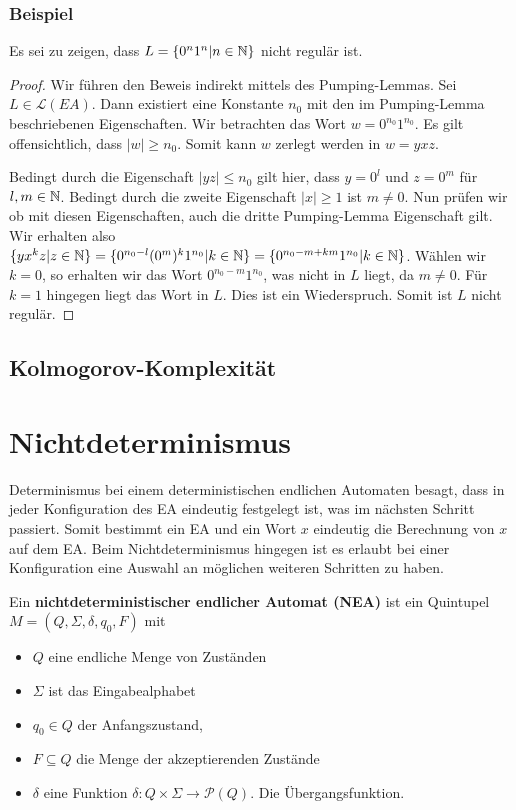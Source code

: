 \subsubsection{Beispiel}
Es sei zu zeigen, dass $L = \{0^n 1^n | n \in \mathbb{N}\}$ nicht regulär ist.

\begin{proof}
Wir führen den Beweis indirekt mittels des Pumping-Lemmas. Sei $L \in \mathcal{L}(EA)$. Dann existiert eine Konstante $n_0$ mit den im Pumping-Lemma beschriebenen Eigenschaften. Wir betrachten das Wort $w = 0^{n_0} 1^{n_0}$. Es gilt offensichtlich, dass $|w| \geq n_0$. Somit kann $w$ zerlegt werden in $w = y x z$.

Bedingt durch die Eigenschaft $|yz| \leq n_0$ gilt hier, dass $y = 0^l$ und $z = 0^m$ für $l, m \in \mathbb{N}$. Bedingt durch die zweite Eigenschaft $|x| \geq 1$ ist $m \not= 0$. Nun prüfen wir ob mit diesen Eigenschaften, auch die dritte Pumping-Lemma Eigenschaft gilt. Wir erhalten also $\{ y x^k z | z \in \mathbb{N}\} = \{ 0^{n_0 - l} (0^m)^k 1^{n_0} | k \in \mathbb{N} \} = \{ 0^{n_0 - m + km} 1^{n_0} | k \in \mathbb{N} \}$. Wählen wir $k = 0$, so erhalten wir das Wort $0^{n_0 - m} 1^{n_0}$, was nicht in $L$ liegt, da $m \not= 0$. Für $k = 1$ hingegen liegt das Wort in $L$. Dies ist ein Wiederspruch. Somit ist $L$ nicht regulär.
\end{proof}

\subsection{Kolmogorov-Komplexität}

\section{Nichtdeterminismus}
Determinismus bei einem deterministischen endlichen Automaten besagt, dass in jeder Konfiguration des EA eindeutig festgelegt ist, was im nächsten Schritt passiert. Somit bestimmt ein EA und ein Wort $x$ eindeutig die Berechnung von $x$ auf dem EA. Beim Nichtdeterminismus hingegen ist es erlaubt bei einer Konfiguration eine Auswahl an möglichen weiteren Schritten zu haben.

\begin{definition}
Ein \textbf{nichtdeterministischer endlicher Automat (NEA)} ist ein Quintupel $M = (Q, \Sigma, \delta, q_0, F)$ mit
\begin{itemize}
  \item $Q$ eine endliche Menge von Zuständen
  \item $\Sigma$ ist das Eingabealphabet
  \item $q_0 \in Q$ der Anfangszustand,
  \item $F \subseteq Q$ die Menge der akzeptierenden Zustände
  \item $\delta$ eine Funktion $\delta: Q \times \Sigma \to \mathcal{P}(Q)$. Die Übergangsfunktion.\\
\end{itemize}
\end{definition}

